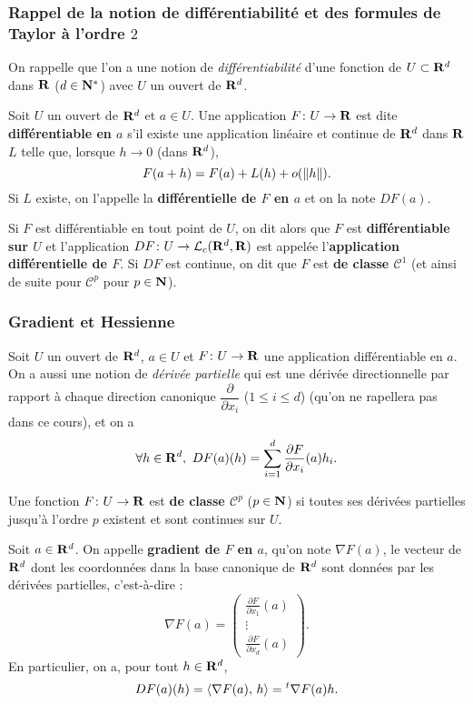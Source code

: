 \documentclass[grape]{../ceri/sty/MasterNotes}
\begin{document}
\subsubsection{Rappel de la notion de différentiabilité et des formules de Taylor à l'ordre $2$}

On rappelle que l'on a une notion de \textit{différentiabilité} d'une fonction de $U\subset\mathbf{R}^d$ dans $\mathbf{R}$ ($d\in\mathbf{N}^*$) avec $U$ un ouvert de $\mathbf{R}^d$.

\begin{defin}
    Soit $U$ un ouvert de $\mathbf{R}^d$ et $a\in U$. Une application $F\colon U\to\mathbf{R}$ est dite \textbf{différentiable en $a$} s'il existe une application linéaire et continue de $\mathbf{R}^d$ dans $\mathbf{R}$ $L$ telle que, lorsque $h\to 0$ (dans $\mathbf{R}^d$),
    \[ F(a+h) = F(a) + L(h) + o(\norme h). \]
    Si $L$ existe, on l'appelle la \textbf{différentielle de $F$ en $a$} et on la note $DF(a)$.
\end{defin}

Si $F$ est différentiable en tout point de $U$, on dit alors que $F$ est \textbf{différentiable sur $U$} et l'application $DF\colon U\to\mathcal L_c(\mathbf{R}^d,\mathbf{R})$ est appelée l'\textbf{application différentielle de $F$}. Si $DF$ est continue, on dit que $F$ est \textbf{de classe $\mathcal C^1$} (et ainsi de suite pour $\mathcal C^p$ pour $p\in\mathbf{N}$).

\subsubsection{Gradient et Hessienne}

Soit $U$ un ouvert de $\mathbf{R}^d$, $a\in U$ et $F\colon U\to\mathbf{R}$ une application différentiable en $a$. On a aussi une notion de \textit{dérivée partielle} qui est une dérivée directionnelle par rapport à chaque direction canonique $\dfrac\partial{\partial x_i}$ ($1\le i\le d$) (qu'on ne rapellera pas dans ce cours), et on a
\[ \forall h\in\mathbf{R}^d,\ DF(a)(h) = \sum_{i=1}^d\frac{\partial F}{\partial x_i}(a)h_i. \]

Une fonction $F\colon U\to\mathbf{R}$ est \textbf{de classe $\mathcal C^p$} ($p\in\mathbf{N}$) si toutes ses dérivées partielles jusqu'à l'ordre $p$ existent et sont continues sur $U$.

Soit $a\in\mathbf{R}^d$. On appelle \textbf{gradient de $F$ en $a$}, qu'on note $\nabla F(a)$, le vecteur de $\mathbf{R}^d$ dont les coordonnées dans la base canonique de $\mathbf{R}^d$ sont données par les dérivées partielles, c'est-à-dire :
\[ \nabla F(a) = \begin{pmatrix}
        \frac{\partial F}{\partial x_1}(a) \\
        \vdots                             \\
        \frac{\partial F}{\partial x_d}(a)
    \end{pmatrix}. \]
En particulier, on a, pour tout $h\in\mathbf{R}^d$,
\[ DF(a)(h) = \ps{\nabla F(a)}{h} = {}^t\nabla F(a)h. \]
\end{document}
